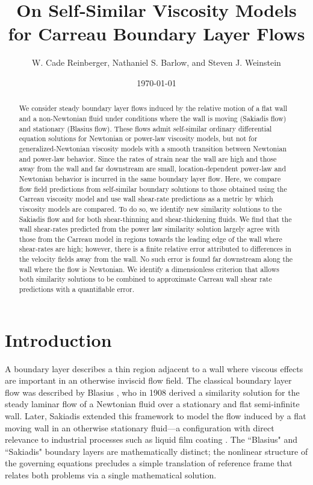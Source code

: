 \documentclass{article}
\title{On Self‑Similar Viscosity Models for Carreau Boundary Layer Flows}
\author{W. Cade Reinberger, Nathaniel S. Barlow, and Steven J. Weinstein}
\date{\today}
\begin{document}
\maketitle

\begin{abstract}
   We consider steady boundary layer flows induced by the relative motion of a flat wall and a non-Newtonian fluid under conditions where the wall is moving (Sakiadis flow) and stationary (Blasius flow). These flows admit self-similar ordinary differential equation solutions for Newtonian or power-law viscosity models, but not for generalized-Newtonian viscosity models with a smooth transition between Newtonian and power-law behavior. Since the rates of strain near the wall are high and those away from the wall and far downstream are small, location-dependent power-law and Newtonian behavior is incurred in the same boundary layer flow. Here, we compare flow field predictions from self-similar boundary solutions to those obtained using the Carreau viscosity model and use wall shear-rate predictions as a metric by which viscosity models are compared. To do so, we identify new similarity solutions to the Sakiadis flow and for both shear-thinning and shear-thickening fluids. We find that the wall shear-rates predicted from the power law similarity solution largely agree with those from the Carreau model in regions towards the leading edge of the wall where shear-rates are high; however, there is a finite relative error attributed to differences in the velocity fields away from the wall. No such error is found far downstream along the wall where the flow is Newtonian. We identify a dimensionless criterion that allows both similarity solutions to be combined to approximate Carreau wall shear rate predictions with a quantifiable error. 
\end{abstract}

\section{Introduction}

\hspace{\parindent} A boundary layer describes a thin region adjacent to a wall where viscous effects are important in an otherwise inviscid flow field. The classical boundary layer flow was described by Blasius \cite{Blasius}, who in 1908 derived a similarity solution for the steady laminar flow of a Newtonian fluid over a stationary and flat semi-infinite wall. Later, Sakiadis \cite{Sakiadis1961a} extended this framework to model the flow induced by a flat moving wall in an otherwise stationary fluid---a configuration with direct relevance to industrial processes such as liquid film coating \cite{Weinstein2004, TDBlake1994}. The ``Blasius" and ``Sakiadis" boundary layers are mathematically distinct; the nonlinear structure of the governing equations precludes a simple translation of reference frame that relates both problems via a single mathematical solution.
\end{document}
